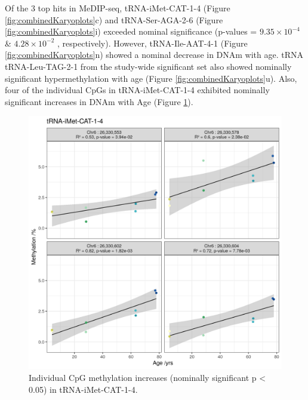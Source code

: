 \documentclass[]{book}
\begin{document}
Of the 3 top hits in MeDIP-seq, tRNA-iMet-CAT-1-4 (Figure \ref{fig:combinedKaryoplots}c) and tRNA-Ser-AGA-2-6 (Figure \ref{fig:combinedKaryoplots}i) exceeded nominal significance (p-values = \(9.35\times10^{-4}\) \& \(4.28\times10^{-2}\) , respectively).
However, tRNA-Ile-AAT-4-1 (Figure \ref{fig:combinedKaryoplots}n) showed a nominal decrease in DNAm with age.
tRNA tRNA-Leu-TAG-2-1 from the study-wide significant set also showed nominally significant hypermethylation with age (Figure \ref{fig:combinedKaryoplots}u).
Also, four of the individual CpGs in tRNA-iMet-CAT-1-4 exhibited nominally significant increases in DNAm with Age (Figure \ref{fig:tRNAiMetCAT1x4nomSigCpG}).

\begin{figure}

{\centering \includegraphics[width=0.8\linewidth]{./figs/tRNA-iMet-CAT-1-4_nomSig_CpG} 

}

\caption{Individual CpG methylation increases (nominally significant p \textless{} 0.05) in tRNA-iMet-CAT-1-4.}\label{fig:tRNAiMetCAT1x4nomSigCpG}
\end{figure}
\end{document}
